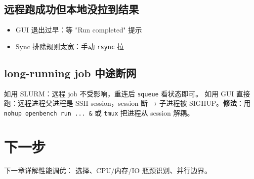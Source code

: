 \subsection{远程跑成功但本地没拉到结果}

\begin{itemize}
  \item GUI 退出过早：等 "Run completed" 提示
  \item Sync 排除规则太宽：手动 \texttt{rsync} 拉
\end{itemize}

\subsection{long-running job 中途断网}

如用 SLURM：远程 job 不受影响，重连后 \texttt{squeue} 看状态即可。
如用 GUI 直接跑：远程进程父进程是 SSH session，session 断 → 子进程被 SIGHUP。\textbf{修法}：用 \texttt{nohup openbench run ... \&} 或 \texttt{tmux} 把进程从 session 解耦。

\section{下一步}

下一章详解性能调优： 选择、CPU/内存/IO 瓶颈识别、并行边界。
